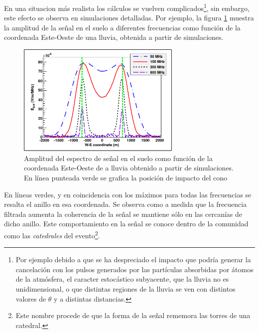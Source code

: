 	En una situacion m\'as realista los c\'alculos se vuelven complicados\footnote{Por ejemplo debido a que se ha despreciado el impacto que podr\'ia generar la cancelaci\'on con los pulsos generados por las part\'iculas absorbidas por \'atomos de la atm\'osfera, el caracter estoc\'astico subyacente, que la lluvia no es unidimensional, o que distintas regiones de la lluvia se ven con distintos valores de $\theta$ y a distintas distancias.}, sin embargo, este efecto se observa en simulaciones detalladas.
	Por ejemplo, la figura \ref{fig:chConeSig} muestra la amplitud de la señal en el suelo a diferentes frecuencias como función de la coordenada Este-Oeste de una lluvia, obtenida a partir de simulaciones.
	\begin{figure}[ht!]
	\centering
		\includegraphics[width=0.7\textwidth]{fig/EASRadio/chConeSig}
		\caption{\label{fig:chConeSig} Amplitud del espectro de se\~nal en el suelo como funci\'on de la coordenada Este-Oeste de a lluvia obtenido a partir de simulaciones. En l\'inea punteada verde se grafica la posici\'on de impacto del cono \cher{}}
	\end{figure}
	En l\'ineas verdes, y en coincidencia con los máximos para todas las frecuencias se resalta el anillo \cher{} en esa coordenada.
	Se observa como a medida que la frecuencia filtrada aumenta la coherencia de la se\~nal se mantiene sólo en las cercan\'ias de dicho anillo.
	Este comportamiento en la se\~nal se conoce dentro de la comunidad como las \emph{catedrales} del evento\footnote{Este nombre procede de que la forma de la se\~nal rememora las torres de una catedral.}.
	
